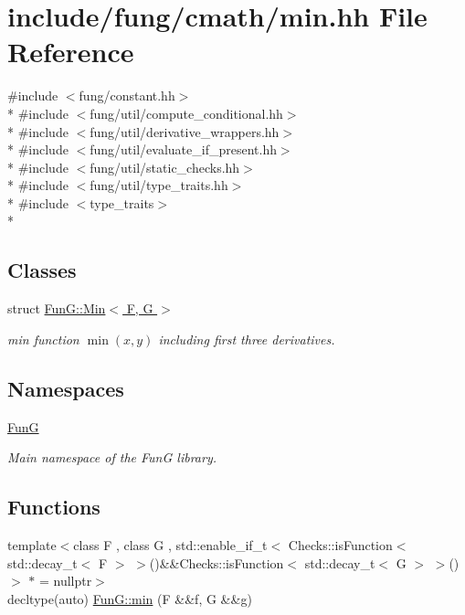 \hypertarget{min_8hh}{}\section{include/fung/cmath/min.hh File Reference}
\label{min_8hh}
{\ttfamily \#include $<$fung/constant.\+hh$>$}\\*
{\ttfamily \#include $<$fung/util/compute\+\_\+conditional.\+hh$>$}\\*
{\ttfamily \#include $<$fung/util/derivative\+\_\+wrappers.\+hh$>$}\\*
{\ttfamily \#include $<$fung/util/evaluate\+\_\+if\+\_\+present.\+hh$>$}\\*
{\ttfamily \#include $<$fung/util/static\+\_\+checks.\+hh$>$}\\*
{\ttfamily \#include $<$fung/util/type\+\_\+traits.\+hh$>$}\\*
{\ttfamily \#include $<$type\+\_\+traits$>$}\\*
\subsection*{Classes}
\begin{DoxyCompactItemize}
\item 
struct \hyperlink{structFunG_1_1Min}{Fun\+G\+::\+Min$<$ F, G $>$}
\begin{DoxyCompactList}\small\item\em min function $ \min(x,y) $ including first three derivatives. \end{DoxyCompactList}\end{DoxyCompactItemize}
\subsection*{Namespaces}
\begin{DoxyCompactItemize}
\item 
 \hyperlink{namespaceFunG}{FunG}
\begin{DoxyCompactList}\small\item\em Main namespace of the FunG library. \end{DoxyCompactList}\end{DoxyCompactItemize}
\subsection*{Functions}
\begin{DoxyCompactItemize}
\item 
{\footnotesize template$<$class F , class G , std\+::enable\+\_\+if\+\_\+t$<$ Checks\+::is\+Function$<$ std\+::decay\+\_\+t$<$ F $>$ $>$()\&\&\+Checks\+::is\+Function$<$ std\+::decay\+\_\+t$<$ G $>$ $>$() $>$ $\ast$  = nullptr$>$ }\\decltype(auto) \hyperlink{group__CMathGroup_ga3d156db4f00a5d74a7c43c6d8e32f848}{Fun\+G\+::min} (F \&\&f, G \&\&g)
\end{DoxyCompactItemize}
